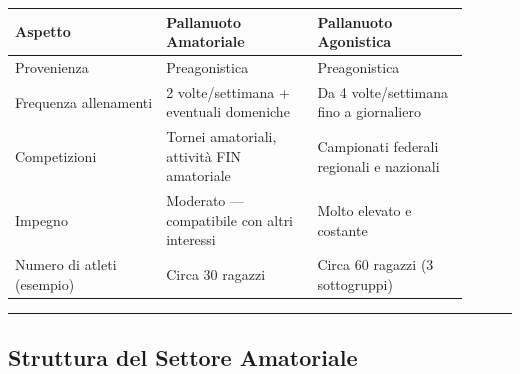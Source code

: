 \documentclass[a4paper,11pt]{article}
\begin{document}
\begin{longtable}[]{@{}p{0.30\linewidth}p{0.30\linewidth}p{0.30\linewidth}@{}}
      \toprule\noalign{}
      Aspetto                    & Pallanuoto Amatoriale                        & Pallanuoto Agonistica \\
      \midrule\noalign{}
      \endhead
      \bottomrule\noalign{}
      \endlastfoot
      Provenienza                & Preagonistica                                & Preagonistica         \\
      Frequenza allenamenti      & 2 volte/settimana + eventuali domeniche      & Da 4
      volte/settimana fino a giornaliero                                                                \\
      Competizioni               & Tornei amatoriali, attività FIN amatoriale   & Campionati
      federali regionali e nazionali                                                                    \\
      Impegno                    & Moderato --- compatibile con altri interessi & Molto elevato e
      costante                                                                                          \\
      Numero di atleti (esempio) & Circa 30 ragazzi                             & Circa 60 ragazzi (3
      sottogruppi)                                                                                      \\
\end{longtable}

\begin{center}\rule{0.5\linewidth}{0.5pt}\end{center}

\subsection{Struttura del Settore
      Amatoriale}\label{struttura-del-settore-amatoriale}
\end{document}
